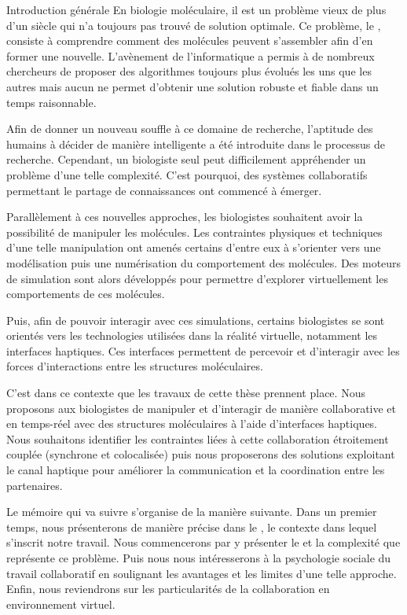 \documentclass[myfrancais,ngerman,english,french]{mythesis}
\begin{document}
	\begin{mychapter+}{Introduction générale}
		En biologie moléculaire, il est un problème vieux de plus d'un siècle qui n'a toujours pas trouvé de solution optimale.
		Ce problème, le , consiste à comprendre comment des molécules peuvent s'assembler afin d'en former une nouvelle.
		L'avènement de l'informatique a permis à de nombreux chercheurs de proposer des algorithmes toujours plus évolués les uns que les autres mais aucun ne permet d'obtenir une solution robuste et fiable dans un temps raisonnable.

		Afin de donner un nouveau souffle à ce domaine de recherche, l'aptitude des humains à décider de manière intelligente a été introduite dans le processus de recherche.
		Cependant, un biologiste seul peut difficilement appréhender un problème d'une telle complexité.
		C'est pourquoi, des systèmes collaboratifs permettant le partage de connaissances ont commencé à émerger.

		Parallèlement à ces nouvelles approches, les biologistes souhaitent avoir la possibilité de manipuler les molécules.
		Les contraintes physiques et techniques d'une telle manipulation ont amenés certains d'entre eux à s'orienter vers une modélisation puis une numérisation du comportement des molécules.
		Des moteurs de simulation sont alors développés pour permettre d'explorer virtuellement les comportements de ces molécules.

		Puis, afin de pouvoir interagir avec ces simulations, certains biologistes se sont orientés vers les technologies utilisées dans la réalité virtuelle, notamment les interfaces haptiques.
		Ces interfaces permettent de percevoir et d'interagir avec les forces d'interactions entre les structures moléculaires.

		C'est dans ce contexte que les travaux de cette thèse prennent place.
		Nous proposons aux biologistes de manipuler et d'interagir de manière collaborative et en temps-réel avec des structures moléculaires à l'aide d'interfaces haptiques.
		Nous souhaitons identifier les contraintes liées à cette collaboration étroitement couplée (synchrone et colocalisée) puis nous proposerons des solutions exploitant le canal haptique pour améliorer la communication et la coordination entre les partenaires.

		Le mémoire qui va suivre s'organise de la manière suivante.
		Dans un premier temps, nous présenterons de manière précise dans le , le contexte dans lequel s'inscrit notre travail.
		Nous commencerons par y présenter le  et la complexité que représente ce problème.
		Puis nous nous intéresserons à la psychologie sociale du travail collaboratif en soulignant les avantages et les limites d'une telle approche.
		Enfin, nous reviendrons sur les particularités de la collaboration en environnement virtuel.


\end{mychapter+}
\end{document}
